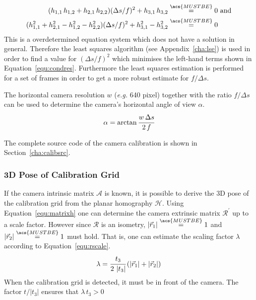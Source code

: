 \documentclass[12pt,a4paper,oneside,openright]{book}
\newcommand{\eg}{\emph{e.g.} }
\newcommand{\Ie}{That is, }
\newcommand{\sct}[1]{Section~\ref{cha:#1}}
\newcommand{\equ}[1]{Equation~\ref{equ:#1}}
\newcommand{\anx}[1]{Appendix~\ref{cha:#1}}
\begin{document}
\begin{CJK}{UTF8}{}
\begin{equation}\label{equ:condres}
  \begin{split}
    (h_{1,1}\,h_{1,2}+h_{2,1}\,h_{2,2})(\Delta s/f)^2+h_{3,1}\,h_{3,2}&\overset{\acs{MUSTBE}}{=}0\mathrm{\ and}\\
    (h_{1,1}^2+h_{2,1}^2-h_{1,2}^2-h_{2,2}^2)(\Delta s/f)^2+h_{3,1}^2-h_{3,2}^2&\overset{\acs{MUSTBE}}{=}0
  \end{split}
\end{equation}
This is a overdetermined equation system which does not have a solution in general. Therefore the least squares algorithm (see \anx{lse}) is used in order to find a value for $(\Delta s/f)^2$ which minimises the left-hand terms shown in \equ{condres}. Furthermore the least squares estimation is performed for a set of frames in order to get a more robust estimate for $f/\Delta s$.

The horizontal camera resolution $w$ (\eg 640 pixel) together with the ratio $f/\Delta s$ can be used to determine the camera's horizontal angle of view $\alpha$.
\begin{equation}
  \alpha=\arctan\cfrac{w\,\Delta s}{2\,f}
\end{equation}

The complete source code of the camera calibration is shown in \sct{calibsrc}.

\subsubsection{\acs{3D} Pose of Calibration Grid}\label{cha:gridpose}
If the camera intrinsic matrix $\mathcal{A}$ is known, it is possible to derive the \ac{3D} pose of the calibration grid from the planar homography $\mathcal{H}$. Using \equ{matrixh} one can determine the camera extrinsic matrix $\mathcal{R}^\prime$ up to a scale factor. However since $\mathcal{R}$ is an isometry, $\left|\vec{r}_1\right|\overset{\acs{MUSTBE}}{=}1$ and $\left|\vec{r}_2\right|\overset{\acs{MUSTBE}}{=}1$ must hold. \Ie one can estimate the scaling factor $\lambda$ according to \equ{rscale}.
\begin{equation}\label{equ:rscale}
  \lambda=\cfrac{t_3}{2\,\left|t_3\right|}\,(\left|\vec{r}_1\right|+\left|\vec{r}_2\right|)
\end{equation}
When the calibration grid is detected, it must be in front of the camera. The factor $t/\left|t_3\right|$ ensures that $\lambda\,t_3>0$


\end{CJK}
\end{document}
